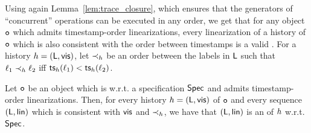 %

Using again Lemma~\ref{lem:trace_closure}, which ensures that the generators of ``concurrent'' operations can be executed in any order, we get that for any \crdtlinearizable{} object $\mathtt{o}$ which admits timestamp-order linearizations, every linearization of a history of $\mathtt{o}$ which is also consistent with the order between timestamps is a valid \crdtlinearization{}.
For a history ${h}=(\mathsf{L},\mathsf{vis})$, let $\prec_{{h}}$ be an order between the labels in $\mathsf{L}$ such that $\ell_1\prec_{{h}}\ell_2$ iff $\mathsf{ts}_{{h}}(\ell_1) < \mathsf{ts}_{{h}}(\ell_2)$.
\vspace{-5pt}

\begin{lemma}
Let $\mathtt{o}$ be an object which is \crdtlinearizable{} w.r.t. a specification $\mathsf{Spec}$ and admits timestamp-order linearizations. Then, for every history ${h}=(\mathsf{L},\mathsf{vis})$ of $\mathtt{o}$ and every sequence $(\mathsf{L},\mathsf{lin})$ which is consistent with $\mathsf{vis}$ and $\prec_{{h}}$, we have that $(\mathsf{L},\mathsf{lin})$ is an \crdtlinearization{} of ${h}$ w.r.t. $\mathsf{Spec}$.
\end{lemma}
\vspace{-5pt}

